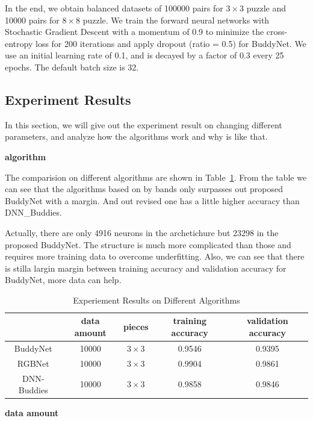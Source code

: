 \documentclass{article}
\begin{document}
In the end, we obtain balanced datasets of 100000 pairs for $3\times 3$ puzzle and 10000 pairs for  $8\times 8$ puzzle. We train the forward neural networks with Stochastic Gradient Descent with a momentum of 0.9 to minimize the cross-entropy loss for 200 iterations and apply dropout (ratio = 0.5) for BuddyNet. We use an initial learning rate of 0.1, and is decayed by a factor of 0.3 every 25 epochs. The default batch size is 32.

\subsection{Experiment Results}

In this section, we will give out the experiment result on changing different parameters, and analyze how the algorithms work and why is like that.

\textbf{algorithm}

The comparision on different algorithms are shown in Table~\ref{tab:expalg}. From the table we can see that the algorithms based on by bands only surpasses out proposed BuddyNet with a margin. And out revised one has a little higher accuracy than DNN\_Buddies\cite{sholomon2016dnn}.

Actually, there are only 4916 neurons in the archetichure but 23298 in the proposed BuddyNet. The structure is much more complicated than those and requires more training data to overcome underfitting. Also, we can see that there is stilla largin margin between training accuracy and validation accuracy for BuddyNet, more data can help.

\begin{table}
    \caption{Experiement Results on Different Algorithms}
    \centering
    \label{tab:expalg}
    \begin{tabular}{c|c|c|c|c}
        \hline
        & data amount & pieces & training accuracy & validation accuracy\\
        \hline
        BuddyNet & 10000 & $3\times 3$ & 0.9546 & 0.9395\\
        \hline
        RGBNet & 10000 & $3\times 3$ & 0.9904 & 0.9861\\
        \hline
        \hline
        DNN-Buddies \cite{sholomon2016dnn} & 10000 & $3\times 3$ & 0.9858 & 0.9846\\
        \hline
    \end{tabular}
\end{table}

\textbf{data amount}
\end{document}
